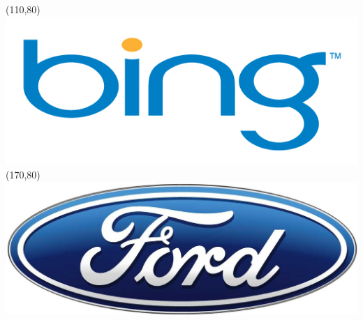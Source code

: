 \begin{frame}
\Put(110,80){\includegraphics[scale=.12]{../common/pics/R_using_logos/bing}}
\Put(170,80){\includegraphics[scale=.29]{../common/pics/R_using_logos/ford}}
\end{frame}



